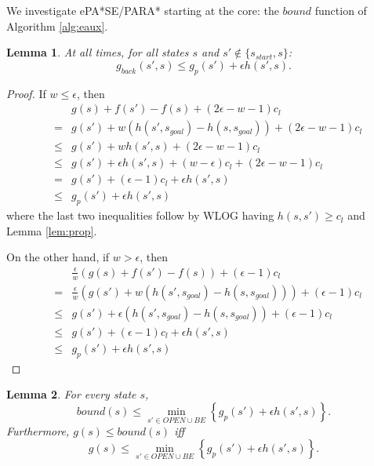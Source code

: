 \documentclass[letterpaper]{article}
\newtheorem{lemma}{Lemma}
\begin{document}
We investigate ePA*SE/PARA* starting at the core: the $bound$ function of Algorithm \ref{alg:eaux}.

\begin{lemma}
\label{lem:indep}
At all times, for all states $s$ and $s'\notin \{s_{start},s\}$:
\[g_{back}(s',s) \le g_p(s') + \epsilon h(s',s).\]
\end{lemma}

\begin{proof}
If $w \le \epsilon$, then
\begin{eqnarray*}
&&g(s) + f(s') - f(s) + (2\epsilon-w-1)c_l
\\&=& g(s') + w(h(s',s_{goal}) - h(s,s_{goal})) + (2\epsilon-w-1)c_l
\\&\le& g(s') + wh(s',s) + (2\epsilon-w-1)c_l
\\&\le& g(s') + \epsilon h(s',s) + (w-\epsilon)c_l + (2\epsilon-w-1)c_l
\\&=& g(s') + (\epsilon-1)c_l + \epsilon h(s',s)
\\&\le& g_p(s') + \epsilon h(s',s)
\end{eqnarray*}
where the last two inequalities follow by WLOG having $h(s,s') \ge c_l$ and Lemma \ref{lem:prop}.

On the other hand, if $w > \epsilon$, then
\begin{eqnarray*}
&&\frac\epsilon w\left(g(s) + f(s') - f(s)\right) + (\epsilon-1)c_l
\\&=& \frac\epsilon w\left(g(s') + w(h(s',s_{goal}) - h(s,s_{goal})) \right) + (\epsilon-1)c_l
\\&\le& g(s') + \epsilon(h(s',s_{goal}) - h(s,s_{goal})) + (\epsilon-1)c_l
\\&\le& g(s') + (\epsilon-1)c_l + \epsilon h(s',s)
\\&\le& g_p(s') + \epsilon h(s',s)
\end{eqnarray*}
\end{proof}

\begin{lemma}
\label{lem:bound}
For every state $s$,
\[bound(s) \le \min_{s'\in OPEN \cup BE} \left\{ g_p(s') + \epsilon h(s',s) \right\}.\]
Furthermore, $g(s) \le bound(s)$ iff
\[g(s) \le \min_{s'\in OPEN \cup BE} \left\{ g_p(s') + \epsilon h(s',s) \right\}.\]
\end{lemma}
\end{document}
